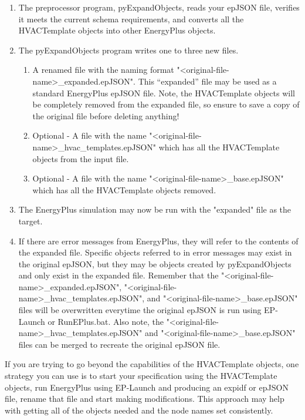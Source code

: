 \begin{enumerate}
\def\labelenumi{\arabic{enumi})}
\item
  The preprocessor program, pyExpandObjects, reads your epJSON file, verifies it meets the current schema requirements, and converts all the HVACTemplate objects into other EnergyPlus objects.
\item
  The pyExpandObjects program writes one to three new files.  
  \begin{enumerate}
  \item
    A renamed file with the naming format "<original-file-name>\_expanded.epJSON". This “expanded” file may be used as a standard EnergyPlus epJSON file.  Note, the HVACTemplate objects will be completely removed from the expanded file, so ensure to save a copy of the original file before deleting anything!
  \item
    Optional - A file with the name "<original-file-name>\_hvac\_templates.epJSON" which has all the HVACTemplate objects from the input file.
  \item
    Optional - A file with the name "<original-file-name>\_base.epJSON" which has all the HVACTemplate objects removed.
  \end{enumerate}
  \item
    The EnergyPlus simulation may now be run with the "expanded" file as the target.
  \item
    If there are error messages from EnergyPlus, they will refer to the contents of the expanded file. Specific objects referred to in error messages may exist in the original epJSON, but they may be objects created by pyExpandObjects and only exist in the expanded file. Remember that the "<original-file-name>\_expanded.epJSON", "<original-file-name>\_hvac\_templates.epJSON", and "<original-file-name>\_base.epJSON" files will be overwritten everytime the original epJSON is run using EP-Launch or RunEPlus.bat.  Also note, the "<original-file-name>\_hvac\_templates.epJSON" and "<original-file-name>\_base.epJSON" files can be merged to recreate the original epJSON file.
\end{enumerate}

If you are trying to go beyond the capabilities of the HVACTemplate objects, one strategy you can use is to start your specification using the HVACTemplate objects, run EnergyPlus using EP-Launch and producing an expidf or epJSON file, rename that file and start making modifications. This approach may help with getting all of the objects needed and the node names set consistently.

